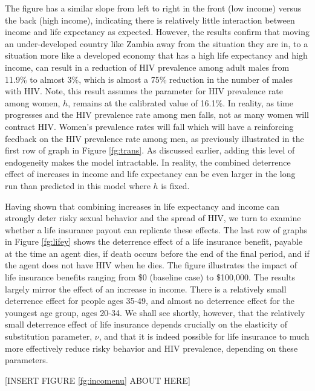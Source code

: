 \documentclass[12pt]{article}
\begin{document}
The figure has a similar slope from left to right in the front (low income) versus the back (high income), indicating there is relatively little interaction between income and life expectancy as expected.  However, the results confirm that moving an under-developed country like Zambia away from the situation they are in, to a situation more like a developed economy that has a high life expectancy and high income, can result in a reduction of HIV prevalence among adult males from 11.9\% to almost 3\%, which is almost a 75\% reduction in the number of males with HIV.  Note, this result assumes the parameter for HIV prevalence rate among women, $h$, remains at the calibrated value of 16.1\%.  In reality, as time progresses and the HIV prevalence rate among men falls, not as many women will contract HIV.  Women's prevalence rates will fall which will have a reinforcing feedback on the HIV prevalence rate among men, as previously illustrated in the first row of graph in Figure \ref{fg:trans}.  As discussed earlier, adding this level of endogeneity makes the model intractable.  In reality, the combined deterrence effect of increases in income and life expectancy can be even larger in the long run than predicted in this model where $h$ is fixed.

Having shown that combining increases in life expectancy and income can strongly deter risky sexual behavior and the spread of HIV, we turn to examine whether a life insurance payout can replicate these effects.  The last row of graphs in Figure \ref{fg:lifey} shows the deterrence effect of a life insurance benefit, payable at the time an agent dies, if death occurs before the end of the final period, and if the agent does not have HIV when he dies.  The figure illustrates the impact of life insurance benefits ranging from \$0 (baseline case) to \$100,000.  The results largely mirror the effect of an increase in income.  There is a relatively small deterrence effect for people ages 35-49, and almost no deterrence effect for the youngest age group, ages 20-34.  We shall see shortly, however, that the relatively small deterrence effect of life insurance depends crucially on the elasticity of substitution parameter, $\nu$, and that it is indeed possible for life insurance to much more effectively reduce risky behavior and HIV prevalence, depending on these parameters.

\begin{center}[INSERT FIGURE \ref{fg:incomenu} ABOUT HERE]\end{center}
\end{document}
